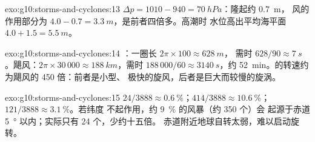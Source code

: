 \begin{solution}{exo:g10:storms-and-cyclones:13}
$\Delta p = 1010 - 940 = \qty{70}{hPa}$：隆起约 \qty{0.7}{m}，
风的作用部分为 $4.0 - 0.7 = \qty{3.3}{m}$，是前者四倍多。高潮时
水位高出平均海平面 $4.0 + 1.5 = \qty{5.5}{m}$。
\end{solution}

\begin{solution}{exo:g10:storms-and-cyclones:14}
：一圈长 $2\pi \times 100 \approx \qty{628}{m}$，
需时 $628/90 \approx \qty{7}{s}$。飓风：$2\pi \times 30\,000 \approx
\qty{188}{km}$，需时 $188\,000/60 \approx \qty{3140}{s}$，约
\qty{52}{min}。的转速约为飓风的 450 倍：前者是小型、
极快的旋风，后者是巨大而较慢的旋涡。
\end{solution}

\begin{solution}{exo:g10:storms-and-cyclones:15}
$24/3888 \approx \qty{0.6}{\percent}$；$414/3888 \approx
\qty{10.6}{\percent}$；$121/3888 \approx \qty{3.1}{\percent}$。若纬度
不起作用，约 \qty{9}{\percent} 的风暴（约 350 个）会
起源于赤道 \qty{5}{\degree} 以内；实际只有 24 个，少约十五倍。
赤道附近地球自转太弱，难以启动旋转。
\end{solution}

